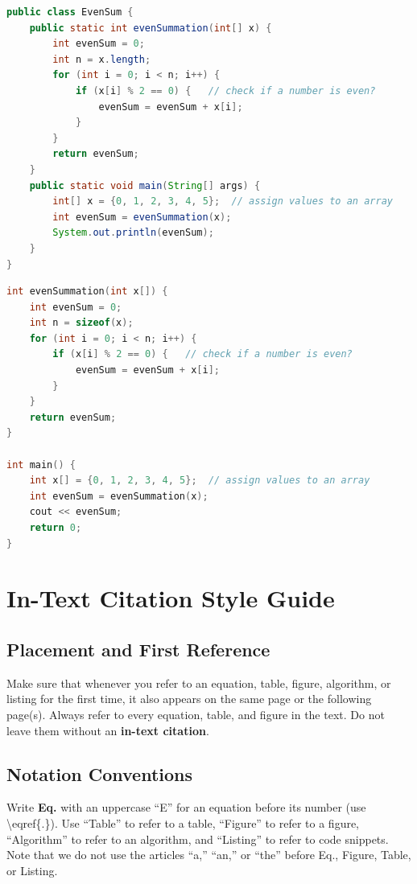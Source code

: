 \clearpage

\begin{lstlisting}[language=Java, 
    caption={Code snippet in \LaTeX~--- Java example}, 
    label=list:java_code_ex]
public class EvenSum {
    public static int evenSummation(int[] x) {
        int evenSum = 0;
        int n = x.length;
        for (int i = 0; i < n; i++) {
            if (x[i] % 2 == 0) {   // check if a number is even?
                evenSum = evenSum + x[i];
            }
        }
        return evenSum;
    }
    public static void main(String[] args) {
        int[] x = {0, 1, 2, 3, 4, 5};  // assign values to an array
        int evenSum = evenSummation(x);
        System.out.println(evenSum);
    }
}
\end{lstlisting}

\begin{lstlisting}[language=C, 
    caption={Code snippet in \LaTeX~--- C/C++ example}, 
    label=list:cpp_code_ex]
int evenSummation(int x[]) {
    int evenSum = 0;
    int n = sizeof(x);
    for (int i = 0; i < n; i++) {
        if (x[i] % 2 == 0) {   // check if a number is even?
            evenSum = evenSum + x[i];
        }
    }
    return evenSum;
}

int main() {
    int x[] = {0, 1, 2, 3, 4, 5};  // assign values to an array
    int evenSum = evenSummation(x);
    cout << evenSum;
    return 0;
}
\end{lstlisting}

\section{In-Text Citation Style Guide}
\label{sec:citation_style}

\subsection{Placement and First Reference}
\label{subsec:refplacement}
Make sure that whenever you refer to an equation, table, figure, algorithm, 
or listing for the first time, it also appears on the same page or the 
following page(s). Always refer to every equation, table, and figure in the 
text. Do not leave them without an \textbf{in-text citation}.

\subsection{Notation Conventions}
\label{subsec:refstyle}
Write \textbf{Eq.} with an uppercase ``E'' for an equation before its number 
(use \textbackslash eqref\{.\}). Use ``Table'' to refer to a table, ``Figure'' 
to refer to a figure, ``Algorithm'' to refer to an algorithm, and ``Listing'' 
to refer to code snippets. Note that we do not use the articles ``a,'' ``an,'' 
or ``the'' before Eq., Figure, Table, or Listing.

